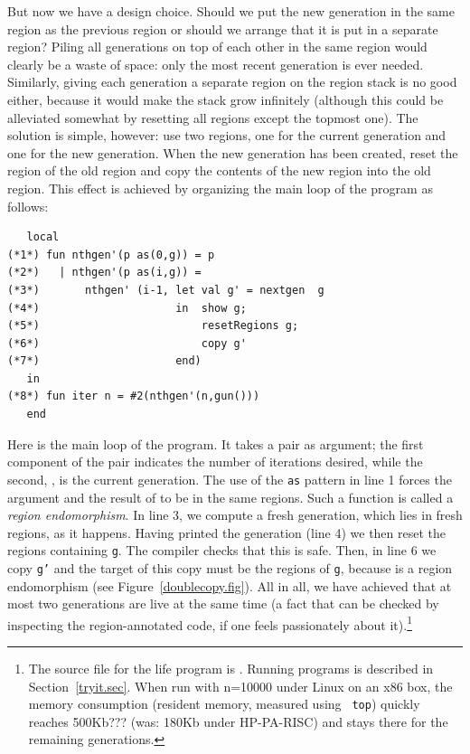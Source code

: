 \documentclass[12pt]{book}
\begin{document}
But now we have a design choice. Should we put the new generation in
the same region as the previous region or should we arrange that it is
put in a separate region? Piling all generations on top of each other
in the same region would clearly be a waste of space: only the most
recent generation is ever needed. Similarly, giving each generation a
separate region on the region stack is no good either, because it
would make the stack grow infinitely (although this could be
alleviated somewhat by resetting all regions except the topmost one).
The solution is simple, however: use two regions, one for the current
generation and one for the new generation. When the new generation has
been created, reset the region of the old region and copy the contents
of the new region into the old region. This effect is achieved by
organizing the main loop of the program as follows:
\begin{verbatim}
   local 
(*1*) fun nthgen'(p as(0,g)) = p 
(*2*)   | nthgen'(p as(i,g)) = 
(*3*)       nthgen' (i-1, let val g' = nextgen  g
(*4*)                     in  show g;
(*5*)                         resetRegions g;
(*6*)                         copy g'
(*7*)                     end)
   in 
(*8*) fun iter n = #2(nthgen'(n,gun()))
   end
\end{verbatim}
Here  
%
is the main loop of the program. It takes a pair as argument; the
first component of the pair indicates the number of iterations
desired, while the second, , is the current generation. The
use of the {\tt as} pattern in line 1 forces the argument and the
result of  to be in the same regions. Such a function
is called a
%
{\em region endomorphism}. In line 3, we compute a fresh generation,
which lies in fresh regions, as it happens. Having printed the
generation (line 4) we then reset the regions containing {\tt g}. The
compiler checks that this is safe. Then, in line 6 we copy {\tt g'}
and the target of this copy must be the regions of {\tt g}, because
 is a region endomorphism (see
Figure~\ref{doublecopy.fig}).  All in all, we have achieved that at
most two generations are live at the same time (a fact that can be
checked by inspecting the region-annotated code, if one feels
passionately about it).\footnote{The source file for the life program
  is . Running programs is described in
  Section~\ref{tryit.sec}. When run with n=10000 under Linux on an x86
  box, the memory consumption (resident memory, measured using {\tt
    top}) quickly reaches 500Kb??? (was: 180Kb under HP-PA-RISC) and
  stays there for the remaining generations.}
\end{document}
